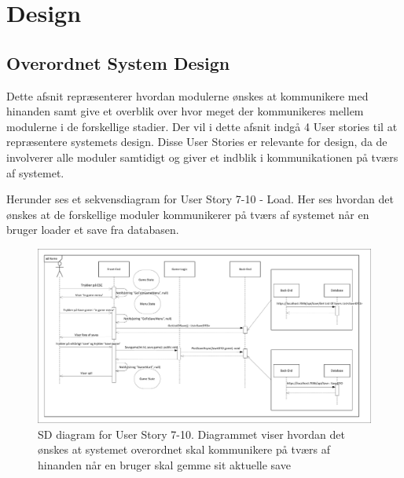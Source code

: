 \section{Design}


\subsection{Overordnet System Design}
\noindent Dette afsnit repræsenterer hvordan modulerne ønskes at kommunikere med hinanden samt give et overblik over hvor meget der kommunikeres mellem modulerne i de forskellige stadier. Der vil i dette afsnit indgå 4 User stories til at repræsentere systemets design. Disse User Stories er relevante for design, da de involverer alle moduler samtidigt og giver et indblik i kommunikationen på tværs af systemet.

\noindent Herunder ses et sekvensdiagram for User Story 7-10 - Load. Her ses hvordan det ønskes at de forskellige moduler kommunikerer på tværs af systemet når en bruger loader et save fra databasen.
\begin{figure}[H]
\centering
\includegraphics[width = \textwidth]{02-Body/Images/Arkitektur - SD Save Game}
\caption{SD diagram for User Story 7-10. Diagrammet viser hvordan det ønskes at systemet overordnet skal kommunikere på tværs af hinanden når en bruger skal gemme sit aktuelle save}
\label{fig:Arkitektur-SD-SaveGame}
\end{figure}

